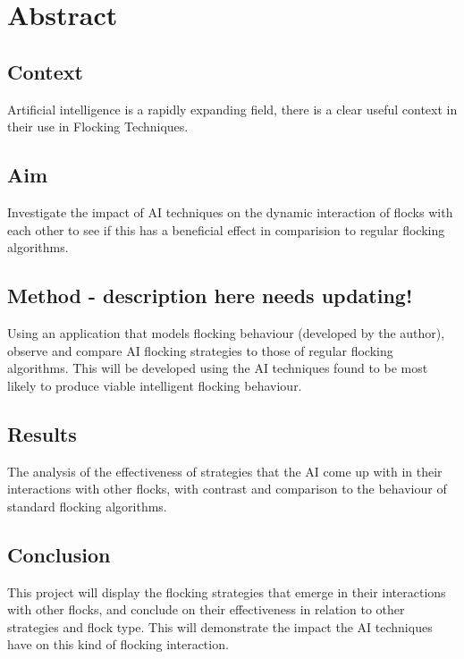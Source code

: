 \section{Abstract}
	
	\subsection{Context}
	Artificial intelligence is a rapidly expanding field, there is a clear useful context in their use in Flocking Techniques.
	
	\subsection{Aim}
	Investigate the impact of AI techniques on the dynamic interaction of flocks with each other to see if this has a 
	beneficial effect in comparision to regular flocking algorithms.
	
	\subsection{Method - description here needs updating!}
	Using an application that models flocking behaviour (developed by the author), observe and compare AI flocking strategies
	to those of regular flocking algorithms. This will be developed using the AI techniques found to be most likely to produce 
	viable intelligent flocking behaviour.
	
	\subsection{Results}
	The analysis of the effectiveness of strategies that the AI come up with in their interactions with other flocks, with
	contrast and comparison to the behaviour of standard flocking algorithms.
	
	\subsection{Conclusion}
	This project will display the flocking strategies that emerge in their interactions with other flocks, and conclude on their
	effectiveness in relation to other strategies and flock type. This will demonstrate the impact the AI techniques have on
	this kind of flocking interaction.
